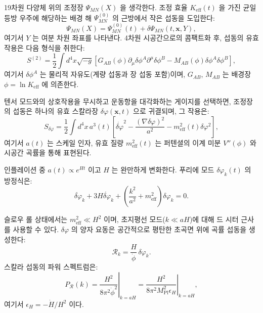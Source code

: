 \documentclass[11pt,a4paper]{article}
\theoremstyle{remark}
\newcommand{\Keff}{K_{\mathrm{eff}}}
\newcommand{\Mpl}{M_{\mathrm{Pl}}}
\begin{document}
	19차원 다양체 위의 조정장 $\Psi_{MN}(X)$ 을 생각한다. 조정 효율 $\Keff(t)$ 을 가진 균일 등방 우주에 해당하는 배경 해 $\Psi^{(0)}_{MN}$ 의 근방에서 작은 섭동을 도입한다:
	\begin{equation}
		\Psi_{MN}(X) = \Psi^{(0)}_{MN}(t) + \delta\Psi_{MN}(t,\mathbf{x},Y),
	\end{equation}
	여기서 $Y$ 는 여분 차원 좌표를 나타낸다. 4차원 시공간으로의 콤팩트화 후, 섭동의 유효 작용은 다음 형식을 취한다:
	\begin{equation}
		S^{(2)} = \frac{1}{2} \int d^4x \sqrt{-g} \left[ G_{AB}(\phi) \partial_\mu \delta\phi^A \partial^\mu \delta\phi^B - M_{AB}(\phi) \delta\phi^A \delta\phi^B \right],
	\end{equation}
	여기서 $\delta\phi^A$ 는 물리적 자유도(계량 섭동과 장 섭동 포함)이며, $G_{AB}$, $M_{AB}$ 는 배경장 $\phi = \ln\Keff$ 에 의존한다.
	
	텐서 모드와의 상호작용을 무시하고 운동항을 대각화하는 게이지를 선택하면, 조정장의 섭동은 하나의 유효 스칼라장 $\delta\varphi(\mathbf{x},t)$ 으로 귀결되며, 그 작용은:
	\begin{equation}
		S_{\delta\varphi} = \frac{1}{2} \int d^4x \, a^3(t) \left[ \dot{\delta\varphi}^2 - \frac{(\nabla\delta\varphi)^2}{a^2} - m_{\mathrm{eff}}^2(t) \delta\varphi^2 \right],
	\end{equation}
	여기서 $a(t)$ 는 스케일 인자, 유효 질량 $m_{\mathrm{eff}}^2(t)$ 는 퍼텐셜의 이계 미분 $V''(\phi)$ 와 시공간 곡률을 통해 표현된다.
	
	인플레이션 중 $a(t) \propto e^{Ht}$ 이고 $H$ 는 완만하게 변화한다. 푸리에 모드 $\delta\varphi_k(t)$ 의 방정식은:
	\begin{equation}
		\ddot{\delta\varphi}_k + 3H\dot{\delta\varphi}_k + \left( \frac{k^2}{a^2} + m_{\mathrm{eff}}^2 \right) \delta\varphi_k = 0.
	\end{equation}
	
	슬로우 롤 상태에서는 $m_{\mathrm{eff}}^2 \ll H^2$ 이며, 초지평선 모드($k \ll aH$)에 대해 드 시터 근사를 사용할 수 있다. $\delta\varphi$ 의 양자 요동은 공간적으로 평탄한 초곡면 위에 곡률 섭동을 생성한다:
	\begin{equation}
		\mathcal{R}_k = \frac{H}{\dot{\phi}} \, \delta\varphi_k.
	\end{equation}
	스칼라 섭동의 파워 스펙트럼은:
	\begin{equation}
		P_{\mathcal{R}}(k) = \left. \frac{H^2}{8\pi^2 \dot{\phi}^2} \right|_{k=aH} = \left. \frac{H^2}{8\pi^2 \Mpl^2 \epsilon_H} \right|_{k=aH},
	\end{equation}
	여기서 $\epsilon_H = -\dot{H}/H^2$ 이다.
	
\end{document}
